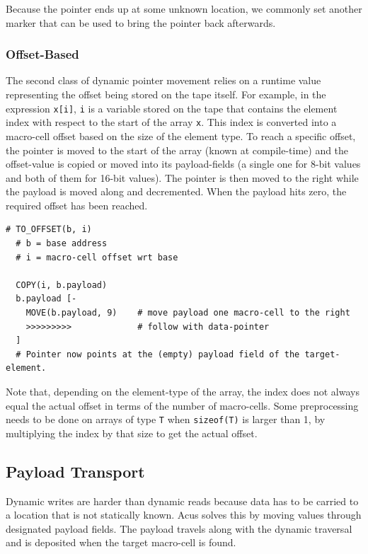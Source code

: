Because the pointer ends up at some unknown location, we commonly set another marker that can be used to bring the pointer back afterwards.

\subsubsection{Offset-Based}
\label{sec:compilation:dynamicmove:offset}
The second class of dynamic pointer movement relies on a runtime value representing the offset being stored on the tape itself. For example, in the expression \texttt{x[i]}, \texttt{i} is a variable stored on the tape that contains the element index with respect to the start of the array \texttt{x}. This index is converted into a macro-cell offset based on the size of the element type. To reach a specific offset, the pointer is moved to the start of the array (known at compile-time) and the offset-value is copied or moved into its payload-fields (a single one for 8-bit values and both of them for 16-bit values). The pointer is then moved to the right while the payload is moved along and decremented. When the payload hits zero, the required offset has been reached.

\vspace{0.5cm}\noindent\begin{minipage}{\linewidth}
\begin{lstlisting}[style=brainfuck]
  # TO_OFFSET(b, i)
  # b = base address
  # i = macro-cell offset wrt base

  COPY(i, b.payload)
  b.payload [-
    MOVE(b.payload, 9)    # move payload one macro-cell to the right
    >>>>>>>>>             # follow with data-pointer
  ]
  # Pointer now points at the (empty) payload field of the target-element.
\end{lstlisting}
\end{minipage}

Note that, depending on the element-type of the array, the index does not always equal the actual offset in terms of the number of macro-cells. Some preprocessing needs to be done on arrays of type \texttt{T} when \texttt{sizeof(T)} is larger than 1, by multiplying the index by that size to get the actual offset.

\subsection{Payload Transport}
\label{sec:compilation:payloadtransport}
Dynamic writes are harder than dynamic reads because data has to be carried to a location that is not statically known. Acus solves this by moving values through designated payload fields. The payload travels along with the dynamic traversal and is deposited when the target macro-cell is found.

